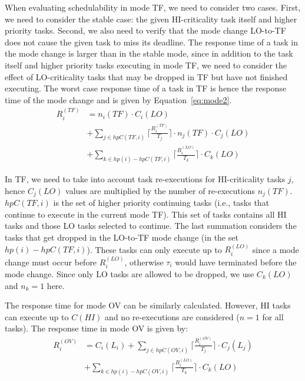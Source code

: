 \documentclass[conference]{IEEEtran}
\begin{document}
When evaluating schedulability in mode TF, we need to consider two cases.  First, we need to consider the stable case: the given HI-criticality task itself and higher priority tasks. Second, we also need to verify that the mode change LO-to-TF does not cause the given task to miss its deadline. The response time of a task in the mode change is larger than in the stable mode, since in addition to the task itself and higher priority tasks executing in mode TF, we need to consider the effect of LO-criticality tasks that may be dropped in TF but have not finished executing. The worst case response time of a task in TF is hence the response time of the mode change and is given by Equation~\eqref{eq:mode2}.
%
\begin{equation}\label{eq:mode2}
\begin{aligned}
R_i^{(TF)} & = n_i(TF) \cdot C_i(LO) \\
&  +\sum_{j \in hpC(TF,i)}\Big\lceil\frac{R_i^{(TF)}}{T_j}\Big\rceil \cdot n_j(TF) \cdot C_j(LO) \\
&  +\sum_{k \in hp(i)-hpC(TF,i)}\Big\lceil\frac{R_i^{(LO)}}{T_k}\Big\rceil \cdot C_k(LO)
\end{aligned}
\end{equation}

In TF, we need to take into account task re-executions for HI-criticality tasks $j$, hence $C_j(LO)$ values are multiplied by the number of re-executions $n_j(TF)$. $hpC(TF,i)$ is the set of higher priority continuing tasks (i.e., tasks that continue to execute in the current mode TF). This set of tasks contains all HI tasks and those LO tasks selected to continue.  The last summation considers the tasks that get dropped in the LO-to-TF mode change (in the set $hp(i)-hpC(TF,i)$). These tasks can only execute up to $R_i^{(LO)}$ since a mode change must occur before $R_i^{(LO)}$, otherwise $\tau_i$ would have terminated before the mode change.  Since only LO tasks are allowed to be dropped, we use $C_k(LO)$ and $n_k=1$ here.


The response time for mode OV can be similarly calculated. However, HI tasks can execute up to $C(HI)$ and no re-executions are considered ($n=1$ for all tasks). The response time in mode OV is given by:
%
\begin{equation}\label{eq:mode3}
\begin{aligned}
R_i^{(OV)} &  = C_i(L_i)+\sum_{j \in hpC(OV,i)}\Big\lceil\frac{R_i^{(OV)}}{T_j}\Big\rceil \cdot C_j(L_j) \\
&  +\sum_{k \in hp(i)-hpC(OV,i)}\Big\lceil\frac{R_i^{(LO)}}{T_k}\Big\rceil \cdot C_k(LO)
\end{aligned}
\end{equation}
\end{document}
